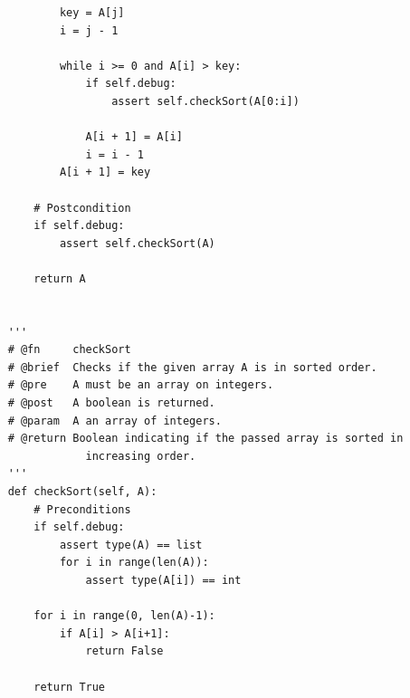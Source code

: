 \documentclass[a4paper]{article}
\begin{document}
\begin{verbatim}
            key = A[j]
            i = j - 1

            while i >= 0 and A[i] > key:
                if self.debug:
                    assert self.checkSort(A[0:i])
                
                A[i + 1] = A[i]
                i = i - 1
            A[i + 1] = key
        
        # Postcondition
        if self.debug:
            assert self.checkSort(A)
        
        return A


    '''
    # @fn     checkSort
    # @brief  Checks if the given array A is in sorted order.
    # @pre    A must be an array on integers.
    # @post   A boolean is returned.
    # @param  A an array of integers.
    # @return Boolean indicating if the passed array is sorted in 
                increasing order.
    ''' 
    def checkSort(self, A):
        # Preconditions
        if self.debug:
            assert type(A) == list
            for i in range(len(A)):
                assert type(A[i]) == int
        
        for i in range(0, len(A)-1):
            if A[i] > A[i+1]:
                return False

        return True
    \end{verbatim}
\end{document}
